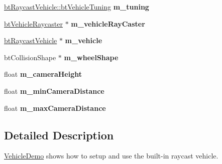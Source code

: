 \begin{DoxyCompactItemize}
\item 
\hypertarget{class_fork_lift_demo_af4604bae1c3c077c5b4c118834210108}{\hyperlink{classbt_raycast_vehicle_1_1bt_vehicle_tuning}{bt\+Raycast\+Vehicle\+::bt\+Vehicle\+Tuning} {\bfseries m\+\_\+tuning}}\label{class_fork_lift_demo_af4604bae1c3c077c5b4c118834210108}

\item 
\hypertarget{class_fork_lift_demo_a33a9646080c458f10b44b2cd7536ae44}{\hyperlink{structbt_vehicle_raycaster}{bt\+Vehicle\+Raycaster} $\ast$ {\bfseries m\+\_\+vehicle\+Ray\+Caster}}\label{class_fork_lift_demo_a33a9646080c458f10b44b2cd7536ae44}

\item 
\hypertarget{class_fork_lift_demo_a17f8ac98ffe7f310851451481883488c}{\hyperlink{classbt_raycast_vehicle}{bt\+Raycast\+Vehicle} $\ast$ {\bfseries m\+\_\+vehicle}}\label{class_fork_lift_demo_a17f8ac98ffe7f310851451481883488c}

\item 
\hypertarget{class_fork_lift_demo_a8ebbb1d216607e17f5e799e49d311e89}{bt\+Collision\+Shape $\ast$ {\bfseries m\+\_\+wheel\+Shape}}\label{class_fork_lift_demo_a8ebbb1d216607e17f5e799e49d311e89}

\item 
\hypertarget{class_fork_lift_demo_a547d3f57053938a16e32ab325ce8d6cf}{float {\bfseries m\+\_\+camera\+Height}}\label{class_fork_lift_demo_a547d3f57053938a16e32ab325ce8d6cf}

\item 
\hypertarget{class_fork_lift_demo_ae6cbba7594ed66605e26ac2e47b45423}{float {\bfseries m\+\_\+min\+Camera\+Distance}}\label{class_fork_lift_demo_ae6cbba7594ed66605e26ac2e47b45423}

\item 
\hypertarget{class_fork_lift_demo_aa75a94abe6db3dffa33b70761c1cd3ae}{float {\bfseries m\+\_\+max\+Camera\+Distance}}\label{class_fork_lift_demo_aa75a94abe6db3dffa33b70761c1cd3ae}

\end{DoxyCompactItemize}


\subsection{Detailed Description}
\hyperlink{class_vehicle_demo}{Vehicle\+Demo} shows how to setup and use the built-\/in raycast vehicle. 


